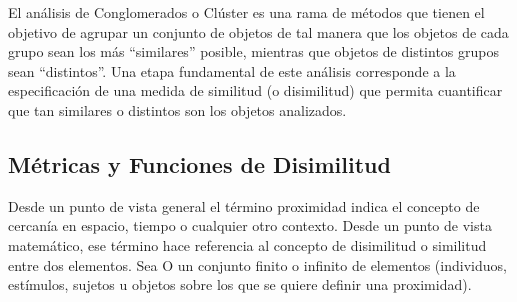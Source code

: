 \documentclass[12pt,oneside]{book}\usepackage[]{graphicx}\usepackage[]{color}
\theoremstyle{definition} %
\begin{document}

El análisis de Conglomerados o Clúster es una rama de métodos que tienen el objetivo de agrupar un conjunto de objetos de tal manera que los objetos de cada grupo sean los más ``similares'' posible, mientras que objetos de distintos grupos sean ``distintos''. Una etapa fundamental de este análisis corresponde a la especificación de una medida de similitud (o disimilitud) que permita cuantificar que tan similares o distintos son los objetos analizados.



\subsection{Métricas y Funciones de Disimilitud}

Desde un punto de vista general el término proximidad indica el concepto de cercanía en espacio, tiempo o cualquier otro contexto. Desde un punto de vista matemático, ese término hace referencia al concepto de disimilitud o similitud entre dos elementos. 
Sea O un conjunto finito o infinito de elementos (individuos, estímulos, sujetos u objetos sobre los que se quiere definir una proximidad).
\end{document}
